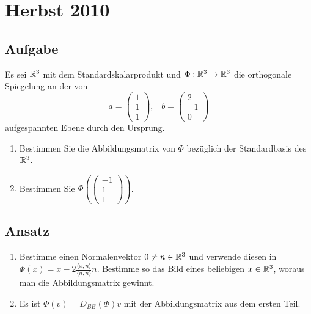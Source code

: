 \section{Herbst 2010}

\subsection{Aufgabe}
Es sei \( \mathbb{R}^3 \) mit dem Standardskalarprodukt und \( \Phi: \mathbb{R}^3 \to \mathbb{R}^3 \) die orthogonale Spiegelung an der von
\begin{equation*}
	a = \begin{pmatrix}
		1 \\ 1 \\ 1
	\end{pmatrix}\text{,} \quad b = \begin{pmatrix}
		2 \\ -1 \\ 0
	\end{pmatrix}
\end{equation*}
aufgespannten Ebene durch den Ursprung.
\begin{enumerate}
	\item Bestimmen Sie die Abbildungsmatrix von \( \Phi \) bezüglich der Standardbasis des \( \mathbb{R}^3 \).
	\item Bestimmen Sie \( \Phi\left( \left( \begin{smallmatrix}
		-1 \\ 1 \\ 1
	\end{smallmatrix} \right) \right) \).
\end{enumerate}

\subsection{Ansatz}
\begin{enumerate}
	\item Bestimme einen Normalenvektor \( 0 \neq n \in \mathbb{R}^3 \) und verwende diesen in \( \Phi(x) = x - 2\tfrac{\langle x,n \rangle}{\langle n,n \rangle}n \). Bestimme so das Bild eines beliebigen \( x \in \mathbb{R}^3 \), woraus man die Abbildungsmatrix gewinnt.
	\item Es ist \( \Phi(v) = D_{BB}(\Phi)v \) mit der Abbildungsmatrix aus dem ersten Teil.
\end{enumerate}

